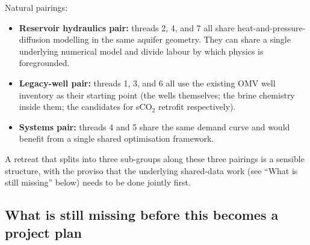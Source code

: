 \documentclass{article}
\begin{document}
Natural pairings:
\begin{itemize}
\item \textbf{Reservoir hydraulics pair:} threads 2, 4, and 7 all
share heat-and-pressure-diffusion modelling in the same aquifer
geometry. They can share a single underlying numerical model and
divide labour by which physics is foregrounded.
\item \textbf{Legacy-well pair:} threads 1, 3, and 6 all use the
existing OMV well inventory as their starting point (the wells
themselves; the brine chemistry inside them; the candidates for
sCO$_2$ retrofit respectively).
\item \textbf{Systems pair:} threads 4 and 5 share the same demand
curve and would benefit from a single shared optimisation framework.
\end{itemize}
A retreat that splits into three sub-groups along these three pairings
is a sensible structure, with the proviso that the underlying
shared-data work (see ``What is still missing'' below) needs to be
done jointly first.

\subsection*{What is still missing before this becomes a project plan}
\end{document}
